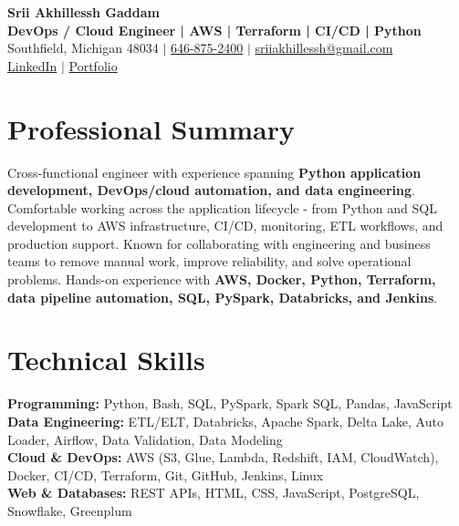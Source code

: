 \documentclass[letterpaper,10pt]{article}
\begin{document}
\fontsize{9.35pt}{10.45pt}\selectfont

\begin{center}
    {\LARGE \textbf{Srii Akhillessh Gaddam}} \\[-1pt]
    \textbf{DevOps / Cloud Engineer | AWS | Terraform | CI/CD | Python} \\[2pt]
    Southfield, Michigan 48034 $|$
    \href{tel:6468752400}{646-875-2400} $|$
    \href{mailto:sriiakhillessh@gmail.com}{sriiakhillessh@gmail.com} \\[1pt]
    \href{https://www.linkedin.com/in/srii-akhiilessh-gaddam-b48668191/}{LinkedIn} $|$
    \href{https://sriiakhillesshg.github.io/portfolio/}{Portfolio}
\end{center}
\vspace{-8pt}

\section{Professional Summary}
\small{Cross-functional engineer with experience spanning \textbf{Python application development, DevOps/cloud automation, and data engineering}. Comfortable working across the application lifecycle - from Python and SQL development to AWS infrastructure, CI/CD, monitoring, ETL workflows, and production support. Known for collaborating with engineering and business teams to remove manual work, improve reliability, and solve operational problems. Hands-on experience with \textbf{AWS, Docker, Python, Terraform, data pipeline automation, SQL, PySpark, Databricks, and Jenkins}.}

\section{Technical Skills}
\small{
\textbf{Programming:} Python, Bash, SQL, PySpark, Spark SQL, Pandas, JavaScript \\
\textbf{Data Engineering:} ETL/ELT, Databricks, Apache Spark, Delta Lake, Auto Loader, Airflow, Data Validation, Data Modeling \\
\textbf{Cloud \& DevOps:} AWS (S3, Glue, Lambda, Redshift, IAM, CloudWatch), Docker, CI/CD, Terraform, Git, GitHub, Jenkins, Linux \\
\textbf{Web \& Databases:} REST APIs, HTML, CSS, JavaScript, PostgreSQL, Snowflake, Greenplum
}
\end{document}
